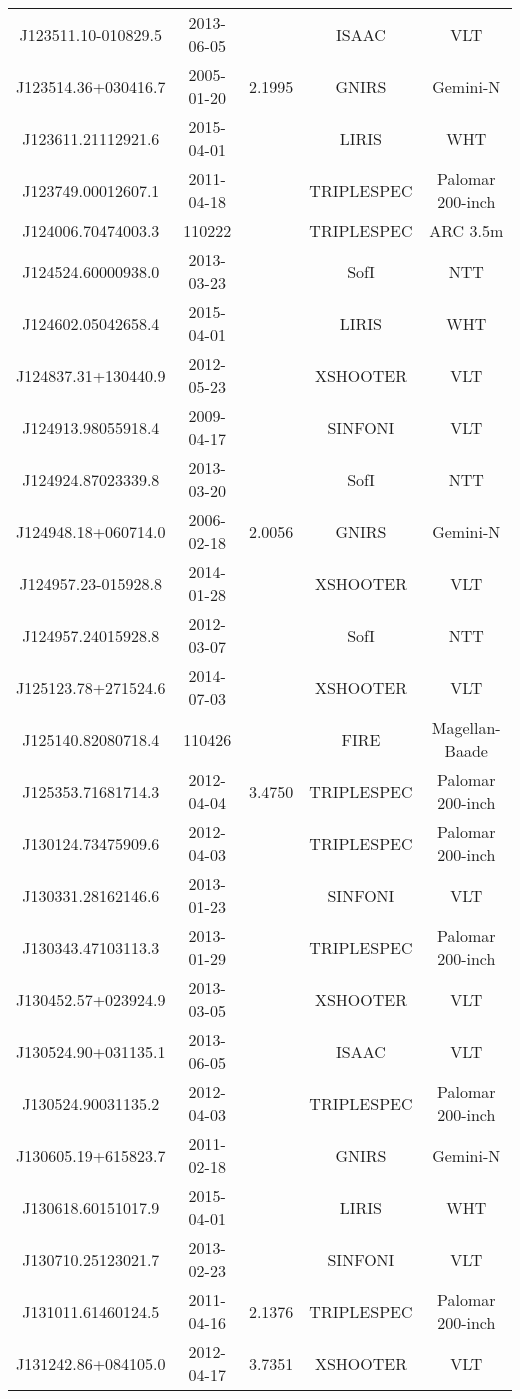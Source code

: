 {\begin{longtable}{ccccc}
J123511.10-010829.5 & 2013-06-05 &  & ISAAC & VLT \\
J123514.36+030416.7 & 2005-01-20 & 2.1995 & GNIRS & Gemini-N \\
J123611.21112921.6 & 2015-04-01 &  & LIRIS & WHT \\
J123749.00012607.1 & 2011-04-18 &  & TRIPLESPEC & Palomar 200-inch \\
J124006.70474003.3 & 110222 &  & TRIPLESPEC & ARC 3.5m \\
J124524.60000938.0 & 2013-03-23 &  & SofI & NTT \\
J124602.05042658.4 & 2015-04-01 &  & LIRIS & WHT \\
J124837.31+130440.9 & 2012-05-23 &  & XSHOOTER & VLT \\
J124913.98055918.4 & 2009-04-17 &  & SINFONI & VLT \\
J124924.87023339.8 & 2013-03-20 &  & SofI & NTT \\
J124948.18+060714.0 & 2006-02-18 & 2.0056 & GNIRS & Gemini-N \\
J124957.23-015928.8 & 2014-01-28 &  & XSHOOTER & VLT \\
J124957.24015928.8 & 2012-03-07 &  & SofI & NTT \\
J125123.78+271524.6 & 2014-07-03 &  & XSHOOTER & VLT \\
J125140.82080718.4 & 110426 &  & FIRE & Magellan-Baade \\
J125353.71681714.3 & 2012-04-04 & 3.4750 & TRIPLESPEC & Palomar 200-inch \\
J130124.73475909.6 & 2012-04-03 &  & TRIPLESPEC & Palomar 200-inch \\
J130331.28162146.6 & 2013-01-23 &  & SINFONI & VLT \\
J130343.47103113.3 & 2013-01-29 &  & TRIPLESPEC & Palomar 200-inch \\
J130452.57+023924.9 & 2013-03-05 &  & XSHOOTER & VLT \\
J130524.90+031135.1 & 2013-06-05 &  & ISAAC & VLT \\
J130524.90031135.2 & 2012-04-03 &  & TRIPLESPEC & Palomar 200-inch \\
J130605.19+615823.7 & 2011-02-18 &  & GNIRS & Gemini-N \\
J130618.60151017.9 & 2015-04-01 &  & LIRIS & WHT \\
J130710.25123021.7 & 2013-02-23 &  & SINFONI & VLT \\
J131011.61460124.5 & 2011-04-16 & 2.1376 & TRIPLESPEC & Palomar 200-inch \\
J131242.86+084105.0 & 2012-04-17 & 3.7351 & XSHOOTER & VLT \\

\end{longtable}}
